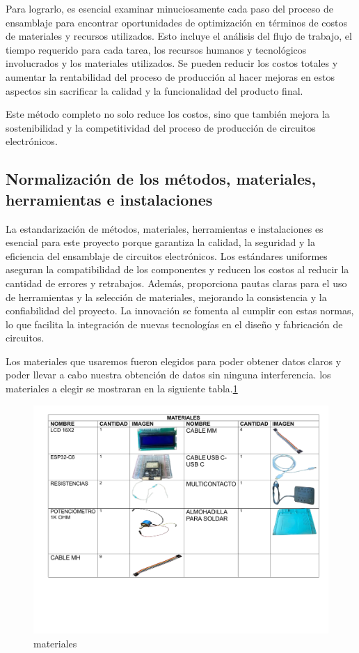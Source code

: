     Para lograrlo, es esencial examinar minuciosamente cada paso del proceso de ensamblaje para encontrar oportunidades de optimización en términos de costos de materiales y recursos utilizados. Esto incluye el análisis del flujo de trabajo, el tiempo requerido para cada tarea, los recursos humanos y tecnológicos involucrados y los materiales utilizados. Se pueden reducir los costos totales y aumentar la rentabilidad del proceso de producción al hacer mejoras en estos aspectos sin sacrificar la calidad y la funcionalidad del producto final.
    
    Este método completo no solo reduce los costos, sino que también mejora la sostenibilidad y la competitividad del proceso de producción de circuitos electrónicos.
    \subsection{Normalización de los métodos, materiales, herramientas e instalaciones}
    La estandarización de métodos, materiales, herramientas e instalaciones es esencial para este proyecto porque garantiza la calidad, la seguridad y la eficiencia del ensamblaje de circuitos electrónicos. Los estándares uniformes aseguran la compatibilidad de los componentes y reducen los costos al reducir la cantidad de errores y retrabajos. Además, proporciona pautas claras para el uso de herramientas y la selección de materiales, mejorando la consistencia y la confiabilidad del proyecto. La innovación se fomenta al cumplir con estas normas, lo que facilita la integración de nuevas tecnologías en el diseño y fabricación de circuitos.
    
    Los materiales que usaremos fueron elegidos para poder obtener datos claros y poder llevar a cabo nuestra obtención de datos sin ninguna interferencia. los materiales a elegir se mostraran en la siguiente tabla.\ref{fig:materiales}
    \begin{figure}[H]
        \centering
        \includegraphics[scale=0.30]{13/img/materiales.pdf}
        \caption{materiales}
        \label{fig:materiales}
    \end{figure}
